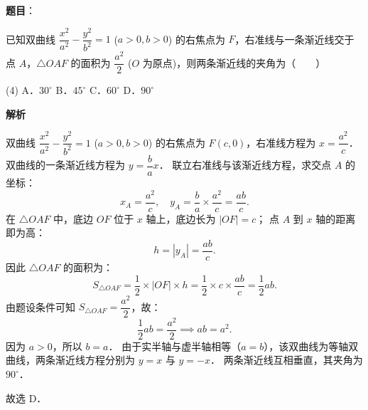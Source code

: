 \begin{answer}

\textbf{题目}：

已知双曲线 $\dfrac{x^2}{a^2} - \dfrac{y^2}{b^2} = 1$ ($a > 0, b > 0$) 的右焦点为 $F$，右准线与一条渐近线交于点 $A$，$\triangle OAF$ 的面积为 $\dfrac{a^2}{2}$ ($O$ 为原点)，则两条渐近线的夹角为\mbox{（　　）}

\begin{gkopts}(4)
\task A．$30^\circ$
\task B．$45^\circ$
\task C．$60^\circ$
\task D．$90^\circ$
\end{gkopts}

\textbf{解析}

双曲线 $\dfrac{x^2}{a^2} - \dfrac{y^2}{b^2} = 1$ ($a > 0, b > 0$) 的右焦点为 $F(c, 0)$，右准线方程为 $x = \dfrac{a^2}{c}$．
双曲线的一条渐近线方程为 $y = \dfrac{b}{a}x$．
联立右准线与该渐近线方程，求交点 $A$ 的坐标：
\nopagebreak[4]
\[
x_A = \frac{a^2}{c}, \quad y_A = \frac{b}{a} \times \frac{a^2}{c} = \frac{ab}{c}.
\]
在 $\triangle OAF$ 中，底边 $OF$ 位于 $x$ 轴上，底边长为 $|OF| = c$；
点 $A$ 到 $x$ 轴的距离即为高：
\nopagebreak[4]
\[
h = |y_A| = \frac{ab}{c}.
\]
因此 $\triangle OAF$ 的面积为：
\nopagebreak[4]
\[
S_{\triangle OAF} = \frac{1}{2} \times |OF| \times h = \frac{1}{2} \times c \times \frac{ab}{c} = \frac{1}{2}ab.
\]
由题设条件可知 $S_{\triangle OAF} = \dfrac{a^2}{2}$，故：
\nopagebreak[4]
\[
\frac{1}{2}ab = \frac{a^2}{2} \implies ab = a^2.
\]
因为 $a > 0$，所以 $b = a$．
由于实半轴与虚半轴相等（$a = b$），该双曲线为等轴双曲线，两条渐近线方程分别为 $y = x$ 与 $y = -x$．
两条渐近线互相垂直，其夹角为 $90^\circ$．

故选 D．


\end{answer}
